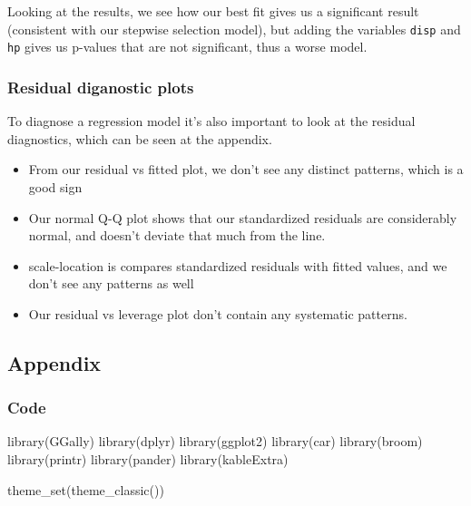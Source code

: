 \documentclass[
]{article}
\newenvironment{Shaded}{\begin{snugshade}}{\end{snugshade}}
\newcommand{\FunctionTok}[1]{\textcolor[rgb]{0.00,0.00,0.00}{#1}}
\newcommand{\NormalTok}[1]{#1}
\providecommand{\tightlist}{%
  \setlength{\itemsep}{0pt}\setlength{\parskip}{0pt}}
\begin{document}
Looking at the results, we see how our best fit gives us a significant
result (consistent with our stepwise selection model), but adding the
variables \texttt{disp} and \texttt{hp} gives us p-values that are not
significant, thus a worse model.

\hypertarget{residual-diganostic-plots}{%
\subsubsection{Residual diganostic
plots}\label{residual-diganostic-plots}}

To diagnose a regression model it's also important to look at the
residual diagnostics, which can be seen at the appendix.

\begin{itemize}
\tightlist
\item
  From our residual vs fitted plot, we don't see any distinct patterns,
  which is a good sign
\item
  Our normal Q-Q plot shows that our standardized residuals are
  considerably normal, and doesn't deviate that much from the line.
\item
  scale-location is compares standardized residuals with fitted values,
  and we don't see any patterns as well
\item
  Our residual vs leverage plot don't contain any systematic patterns.
\end{itemize}

\pagebreak

\hypertarget{appendix}{%
\subsection{Appendix}\label{appendix}}

\hypertarget{code}{%
\subsubsection{Code}\label{code}}

\begin{Shaded}
\begin{Highlighting}[]
\FunctionTok{library}\NormalTok{(GGally)}
\FunctionTok{library}\NormalTok{(dplyr)}
\FunctionTok{library}\NormalTok{(ggplot2)}
\FunctionTok{library}\NormalTok{(car)}
\FunctionTok{library}\NormalTok{(broom)}
\FunctionTok{library}\NormalTok{(printr)}
\FunctionTok{library}\NormalTok{(pander)}
\FunctionTok{library}\NormalTok{(kableExtra)}

\FunctionTok{theme\_set}\NormalTok{(}\FunctionTok{theme\_classic}\NormalTok{())}
\end{Highlighting}
\end{Shaded}
\end{document}
